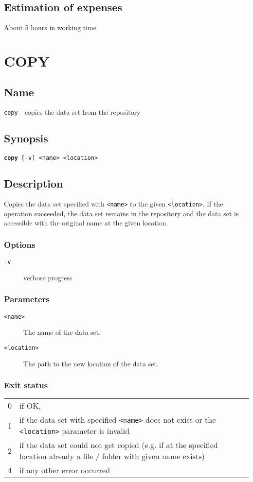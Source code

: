 \documentclass{article} %
\begin{document}
		\subsection{Estimation of expenses}
		About 5 hours in working time
		\newpage
		\section*{COPY}
		\subsection*{Name}
		\texttt{copy} - copies the data set from the repository
		\subsection*{Synopsis}
		\texttt{\textbf{copy} [-v] <name> <location>}
		\subsection*{Description}
		Copies the data set specified with \texttt{<name>} to the given \texttt{<location>}.
		If the operation succeeded, the data set remains in the repository and the data set is accessible with the original name at the given location.\\
		
		\noindent
		\subsubsection*{Options}
		\begin{description}
			\item[\texttt{-v}] verbose progress
		\end{description}
		
		\subsubsection*{Parameters}
		\begin{description}
			\item[\texttt{<name>}] The name of the data set.
			\item[\texttt{<location>}] The path to the new location of the data set.
		\end{description}
		\subsubsection*{Exit status}
		\begin{tabular}{ll}
			0 &  if OK,\\ 
			1 &  if the data set with specified \texttt{<name>} does not exist or the \texttt{<location>} parameter is invalid\\
			2 &  if the data set could not get copied (e.g. if at the specified location already a file / folder with given name exists)\\
			4 &  if any other error occurred\\
		\end{tabular}
		
\end{document}
